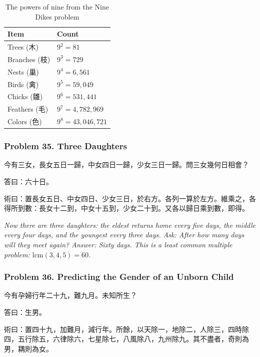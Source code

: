 \documentclass[11pt,a4paper]{article}
\newcommand{\zh}[1]{{\CJKfamily{}#1}}
\begin{document}
\begin{table}[h]
\centering
\begin{tabular}{@{}ll@{}}
\toprule
\textbf{Item} & \textbf{Count} \\
\midrule
Trees (\zh{木}) & $9^2 = 81$ \\
Branches (\zh{枝}) & $9^3 = 729$ \\
Nests (\zh{巢}) & $9^4 = 6{,}561$ \\
Birds (\zh{禽}) & $9^5 = 59{,}049$ \\
Chicks (\zh{雛}) & $9^6 = 531{,}441$ \\
Feathers (\zh{毛}) & $9^7 = 4{,}782{,}969$ \\
Colors (\zh{色}) & $9^8 = 43{,}046{,}721$ \\
\bottomrule
\end{tabular}
\caption{The powers of nine from the Nine Dikes problem}
\end{table}

\subsubsection*{Problem 35. Three Daughters}

\begin{problembox}[title=\zh{問}]
\zh{今有三女，長女五日一歸，中女四日一歸，少女三日一歸。問三女幾何日相會？}
\end{problembox}
\begin{answerbox}[title=\zh{答}]
\zh{答曰：六十日。}
\end{answerbox}
\begin{methodbox}[title=\zh{術}]
\zh{術曰：置長女五日、中女四日、少女三日，於右方。各列一算於左方。維乘之，各得所到數：長女十二到，中女十五到，少女二十到。又各以歸日乘到數，即得。}
\end{methodbox}

\textit{Now there are three daughters: the eldest returns home every five days, the middle every four days, and the youngest every three days. Ask: After how many days will they meet again? Answer: Sixty days. This is a least common multiple problem: $\text{lcm}(3,4,5) = 60$.}

\subsubsection*{Problem 36. Predicting the Gender of an Unborn Child}

\begin{problembox}[title=\zh{問}]
\zh{今有孕婦行年二十九，難九月。未知所生？}
\end{problembox}
\begin{answerbox}[title=\zh{答}]
\zh{答曰：生男。}
\end{answerbox}
\begin{methodbox}[title=\zh{術}]
\zh{術曰：置四十九，加難月，減行年。所餘，以天除一，地除二，人除三，四時除四，五行除五，六律除六，七星除七，八風除八，九州除九。其不盡者，奇則為男，耦則為女。}
\end{methodbox}
\end{document}
